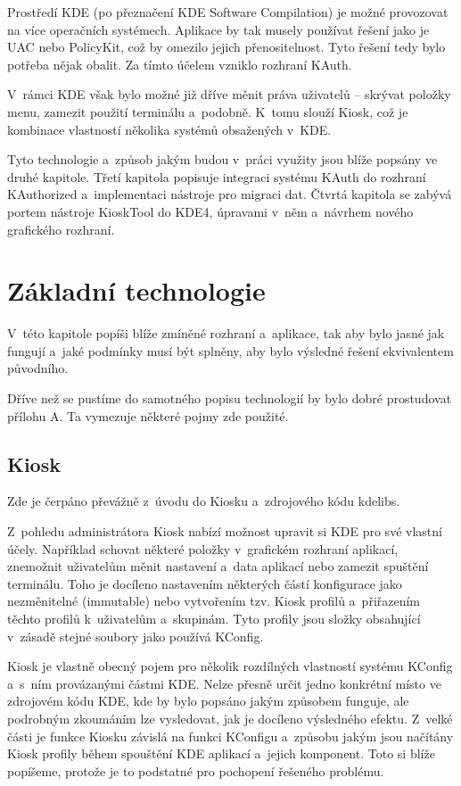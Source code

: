 Prostředí KDE (po přeznačení KDE Software Compilation) je možné provozovat na více operačních systémech. Aplikace by tak musely používat řešení jako je UAC nebo PolicyKit, což by omezilo jejich přenositelnost. Tyto řešení tedy bylo potřeba nějak obalit. Za tímto účelem vzniklo rozhraní KAuth.

V~rámci KDE však bylo možné již dříve měnit práva uživatelů -- skrývat položky menu, zamezit použití terminálu a~podobně. K~tomu slouží Kiosk, což je kombinace vlastností několika systémů obsažených v~KDE.

Tyto technologie a~způsob jakým budou v~práci využity jsou blíže popsány ve druhé kapitole. Třetí kapitola popisuje integraci systému KAuth do rozhraní KAuthorized a~implementaci nástroje pro migraci dat. Čtvrtá kapitola se zabývá portem nástroje KioskTool do KDE4, úpravami v~něm a~návrhem nového grafického rozhraní.

\chapter{Základní technologie}
V~této kapitole popíši blíže zmíněné rozhraní a~aplikace, tak aby bylo jasné jak fungují a~jaké podmínky musí být splněny, aby bylo výsledné řešení ekvivalentem původního.

Dříve než se pustíme do samotného popisu technologií by bylo dobré prostudovat přílohu A. Ta vymezuje některé pojmy zde použité.

\section{Kiosk}
Zde je čerpáno převážně z~úvodu do Kiosku \cite{Kioskintro} a~zdrojového kódu kdelibs.

Z~pohledu administrátora Kiosk nabízí možnost upravit si KDE pro své vlastní účely. Například schovat některé položky v~grafickém rozhraní aplikací, znemožnit uživatelům měnit nastavení a~data aplikací nebo zamezit spuštění terminálu. Toho je docíleno nastavením některých částí konfigurace jako nezměnitelné (immutable) nebo vytvořením tzv. Kiosk profilů a~přiřazením těchto profilů k~uživatelům a~skupinám. Tyto profily jsou složky obsahující v~zásadě stejné soubory jako používá KConfig.

Kiosk je vlastně obecný pojem pro několik rozdílných vlastností systému KConfig a~s~ním provázanými částmi KDE. Nelze přesně určit jedno konkrétní místo ve zdrojovém kódu KDE, kde by bylo popsáno jakým způsobem funguje, ale podrobným zkoumáním lze vysledovat, jak je docíleno výsledného efektu. Z~velké části je funkce Kiosku závislá na funkci KConfigu a~způsobu jakým jsou načítány Kiosk profily během spouštění KDE aplikací a~jejich komponent. Toto si blíže popíšeme, protože je to podstatné pro pochopení řešeného problému.

